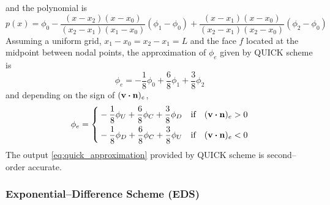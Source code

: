 and the polynomial is
\begin{equation} \label{eq:quick_polynomial_1}
	p(x) = 
	\phi_0 - 
	\frac{(x - x_2) (x - x_0)}{(x_2 - x_1)(x_1 - x_0)} (\phi_1 - \phi_0) + 
	\frac{(x - x_1)(x - x_0)}{(x_2 - x_1)(x_2 - x_0)} (\phi_2 - \phi_0)
\end{equation}
Assuming a uniform grid, \ie $x_1 - x_0 = x_2 - x_1 = L$ and the face $f$ located at the midpoint between nodal points, the approximation of $\phi_e$ given by QUICK scheme is
\begin{equation}
	\phi_e = -\frac{1}{8} \phi_0 + \frac{6}{8} \phi_1 + \frac{3}{8} \phi_2
\end{equation}
and depending on the sign of $(\vb{v} \vdot \vb{n})_e$,
\begin{equation} \label{eq:quick_approximation}
	\phi_e = 
	\left\{
	\begin{aligned}
		&-\frac{1}{8} \phi_U + \frac{6}{8} \phi_C + \frac{3}{8} \phi_D & 
		&\text{if} \quad (\vb{v} \vdot \vb{n})_e > 0 \\
		&-\frac{1}{8} \phi_D + \frac{6}{8} \phi_C + \frac{3}{8} \phi_U & 
		&\text{if} \quad (\vb{v} \vdot \vb{n})_e < 0 \\
	\end{aligned}
	\right.
\end{equation}
The output \eqref{eq:quick_approximation} provided by QUICK scheme is second--order accurate.


\subsubsection{Exponential--Difference Scheme (EDS)}

